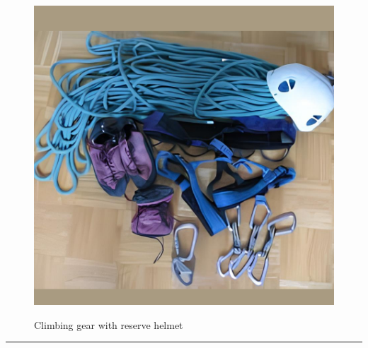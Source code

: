 \documentclass{article}
\begin{document}
    \begin{figure}[H]
        \centering
        \begin{minipage}{0.25\textwidth}
            \centering
            \includegraphics[width=\textwidth]{../SurvivalItemImages/climbinggear}
        \end{minipage}\hfill
        \begin{minipage}{0.7\textwidth}
            \centering
            \Large Climbing gear with reserve helmet
        \end{minipage}
    \end{figure}
    \vspace{-0.8em}
    \noindent\rule{\textwidth}{0.4pt}
            
\end{document}
